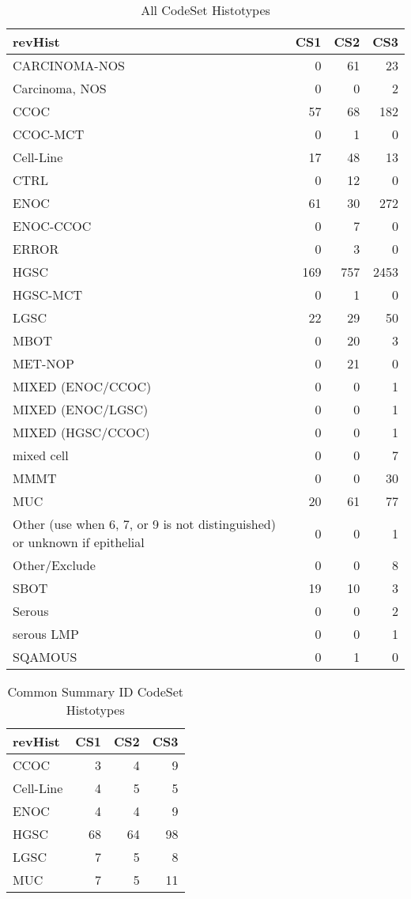 \documentclass[
]{report}
\begin{document}
\begin{table}

\caption{\label{tab:dist-all}All CodeSet Histotypes}
\centering
\begin{tabular}[t]{l|r|r|r}
\hline
revHist & CS1 & CS2 & CS3\\
\hline
CARCINOMA-NOS & 0 & 61 & 23\\
\hline
Carcinoma, NOS & 0 & 0 & 2\\
\hline
CCOC & 57 & 68 & 182\\
\hline
CCOC-MCT & 0 & 1 & 0\\
\hline
Cell-Line & 17 & 48 & 13\\
\hline
CTRL & 0 & 12 & 0\\
\hline
ENOC & 61 & 30 & 272\\
\hline
ENOC-CCOC & 0 & 7 & 0\\
\hline
ERROR & 0 & 3 & 0\\
\hline
HGSC & 169 & 757 & 2453\\
\hline
HGSC-MCT & 0 & 1 & 0\\
\hline
LGSC & 22 & 29 & 50\\
\hline
MBOT & 0 & 20 & 3\\
\hline
MET-NOP & 0 & 21 & 0\\
\hline
MIXED (ENOC/CCOC) & 0 & 0 & 1\\
\hline
MIXED (ENOC/LGSC) & 0 & 0 & 1\\
\hline
MIXED (HGSC/CCOC) & 0 & 0 & 1\\
\hline
mixed cell & 0 & 0 & 7\\
\hline
MMMT & 0 & 0 & 30\\
\hline
MUC & 20 & 61 & 77\\
\hline
Other (use when 6, 7, or 9 is not distinguished) or unknown if epithelial & 0 & 0 & 1\\
\hline
Other/Exclude & 0 & 0 & 8\\
\hline
SBOT & 19 & 10 & 3\\
\hline
Serous & 0 & 0 & 2\\
\hline
serous LMP & 0 & 0 & 1\\
\hline
SQAMOUS & 0 & 1 & 0\\
\hline
\end{tabular}
\end{table}

\begin{table}

\caption{\label{tab:dist-common}Common Summary ID CodeSet Histotypes}
\centering
\begin{tabular}[t]{l|r|r|r}
\hline
revHist & CS1 & CS2 & CS3\\
\hline
CCOC & 3 & 4 & 9\\
\hline
Cell-Line & 4 & 5 & 5\\
\hline
ENOC & 4 & 4 & 9\\
\hline
HGSC & 68 & 64 & 98\\
\hline
LGSC & 7 & 5 & 8\\
\hline
MUC & 7 & 5 & 11\\
\hline
\end{tabular}
\end{table}
\end{document}
